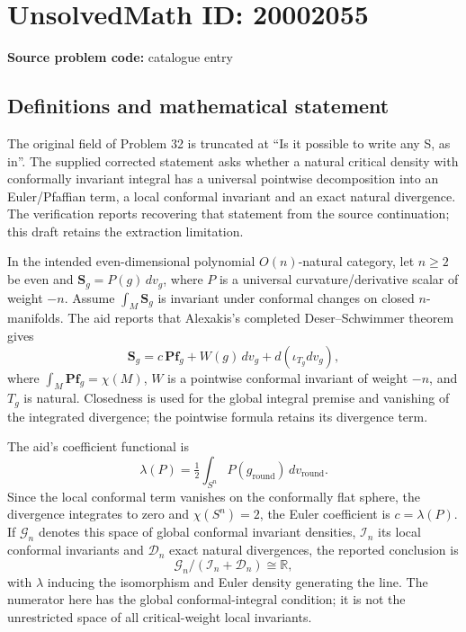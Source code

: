 \documentclass[11pt]{article}
\begin{document}
\section*{UnsolvedMath ID: 20002055}
\textbf{Source problem code:} catalogue entry
\subsection{Definitions and mathematical statement}
The original field of Problem 32 is truncated at ``Is it possible to write any S, as in''. The supplied corrected statement asks whether a natural critical density with conformally invariant integral has a universal pointwise decomposition into an Euler/Pfaffian term, a local conformal invariant and an exact natural divergence. The verification reports recovering that statement from the source continuation; this draft retains the extraction limitation.

In the intended even-dimensional polynomial \(O(n)\)-natural category, let \(n\geq2\) be even and \(\mathbf S_g=P(g)\,dv_g\), where \(P\) is a universal curvature/derivative scalar of weight \(-n\). Assume \(\int_M\mathbf S_g\) is invariant under conformal changes on closed \(n\)-manifolds. The aid reports that Alexakis's completed Deser--Schwimmer theorem gives
\[
 \mathbf S_g=c\,\mathbf{Pf}_g+W(g)\,dv_g+d(\iota_{T_g}dv_g),
\]
where \(\int_M\mathbf{Pf}_g=\chi(M)\), \(W\) is a pointwise conformal invariant of weight \(-n\), and \(T_g\) is natural. Closedness is used for the global integral premise and vanishing of the integrated divergence; the pointwise formula retains its divergence term.

The aid's coefficient functional is
\[
 \lambda(P)=\tfrac12\int_{S^n}P(g_{\mathrm{round}})\,dv_{\mathrm{round}}.
\]
Since the local conformal term vanishes on the conformally flat sphere, the divergence integrates to zero and \(\chi(S^n)=2\), the Euler coefficient is \(c=\lambda(P)\). If \(\mathcal G_n\) denotes this space of global conformal invariant densities, \(\mathcal I_n\) its local conformal invariants and \(\mathcal D_n\) exact natural divergences, the reported conclusion is
\[
 \mathcal G_n/(\mathcal I_n+\mathcal D_n)\cong\mathbb R,
\]
with \(\lambda\) inducing the isomorphism and Euler density generating the line. The numerator here has the global conformal-integral condition; it is not the unrestricted space of all critical-weight local invariants.
\end{document}
